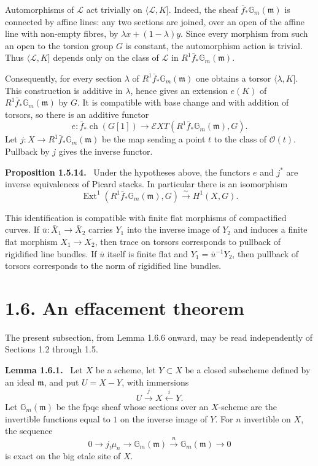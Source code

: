 \documentclass[12pt]{article}
\newcommand{\Ll}{\mathcal L}
\newcommand{\Ocal}{\mathcal O}
\newenvironment{statement}[1]{\par\medskip\noindent\textbf{#1.}\ }{\par\medskip}
\begin{document}
Automorphisms of \(\Ll\) act trivially on \(\langle\Ll,K]\). Indeed, the sheaf \(\bar f_*\mathbb G_m(\mathfrak m)\) is connected by affine lines: any two sections are joined, over an open of the affine line with non-empty fibres, by \(\lambda x+(1-\lambda)y\). Since every morphism from such an open to the torsion group \(G\) is constant, the automorphism action is trivial. Thus \(\langle\Ll,K]\) depends only on the class of \(\Ll\) in \(R^1\bar f_*\mathbb G_m(\mathfrak m)\).

Consequently, for every section \(\lambda\) of \(R^1\bar f_*\mathbb G_m(\mathfrak m)\) one obtains a torsor \(\langle\lambda,K]\). This construction is additive in \(\lambda\), hence gives an extension \(e(K)\) of \(R^1\bar f_*\mathbb G_m(\mathfrak m)\) by \(G\). It is compatible with base change and with addition of torsors, so there is an additive functor
\[
e:\bar f_*\operatorname{ch}(G[1])
\longrightarrow
\mathcal E XT(R^1\bar f_*\mathbb G_m(\mathfrak m),G).
\]
Let \(j:X\to R^1\bar f_*\mathbb G_m(\mathfrak m)\) be the map sending a point \(t\) to the class of \(\Ocal(t)\). Pullback by \(j\) gives the inverse functor.

\begin{statement}{Proposition 1.5.14}
Under the hypotheses above, the functors \(e\) and \(j^*\) are inverse equivalences of Picard stacks. In particular there is an isomorphism
\[
\operatorname{Ext}^1(R^1\bar f_*\mathbb G_m(\mathfrak m),G)
\xrightarrow{\sim}H^1(X,G).
\]
\end{statement}

This identification is compatible with finite flat morphisms of compactified curves. If \(\bar u:\bar X_1\to\bar X_2\) carries \(Y_1\) into the inverse image of \(Y_2\) and induces a finite flat morphism \(X_1\to X_2\), then trace on torsors corresponds to pullback of rigidified line bundles. If \(\bar u\) itself is finite flat and \(Y_1=\bar u^{-1}Y_2\), then pullback of torsors corresponds to the norm of rigidified line bundles.

\section*{1.6. An effacement theorem}

The present subsection, from Lemma 1.6.6 onward, may be read independently of Sections 1.2 through 1.5.

\begin{statement}{Lemma 1.6.1}
Let \(X\) be a scheme, let \(Y\subset X\) be a closed subscheme defined by an ideal \(\mathfrak m\), and put \(U=X-Y\), with immersions
\[
U\xrightarrow{j}X\xleftarrow{i}Y.
\]
Let \(\mathbb G_m(\mathfrak m)\) be the fpqc sheaf whose sections over an \(X\)-scheme are the invertible functions equal to \(1\) on the inverse image of \(Y\). For \(n\) invertible on \(X\), the sequence
\[
0\to j_!\mu_n\to\mathbb G_m(\mathfrak m)\xrightarrow{n}\mathbb G_m(\mathfrak m)\to0
\]
is exact on the big etale site of \(X\).
\end{statement}
\end{document}
